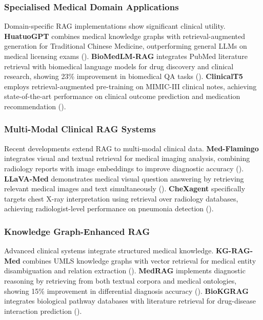 \subsubsection{Specialised Medical Domain Applications}
Domain-specific RAG implementations show significant clinical utility. \textbf{HuatuoGPT} combines medical knowledge graphs with retrieval-augmented generation for Traditional Chinese Medicine, outperforming general LLMs on medical licensing exams (\citep{zhang2023huatuogpt}). \textbf{BioMedLM-RAG} integrates PubMed literature retrieval with biomedical language models for drug discovery and clinical research, showing 23\% improvement in biomedical QA tasks (\citep{bolton2024biomedlm}). \textbf{ClinicalT5} employs retrieval-augmented pre-training on MIMIC-III clinical notes, achieving state-of-the-art performance on clinical outcome prediction and medication recommendation (\citep{lehman2023clinicalt5}).

\subsubsection{Multi-Modal Clinical RAG Systems}
Recent developments extend RAG to multi-modal clinical data. \textbf{Med-Flamingo} integrates visual and textual retrieval for medical imaging analysis, combining radiology reports with image embeddings to improve diagnostic accuracy (\citep{moor2023medflamingo}). \textbf{LLaVA-Med} demonstrates medical visual question answering by retrieving relevant medical images and text simultaneously (\citep{li2023llavamed}). \textbf{CheXagent} specifically targets chest X-ray interpretation using retrieval over radiology databases, achieving radiologist-level performance on pneumonia detection (\citep{chen2024chexagent}).

\subsubsection{Knowledge Graph-Enhanced RAG}
Advanced clinical systems integrate structured medical knowledge. \textbf{KG-RAG-Med} combines UMLS knowledge graphs with vector retrieval for medical entity disambiguation and relation extraction (\citep{yasunaga2023kgragmed}). \textbf{MedRAG} implements diagnostic reasoning by retrieving from both textual corpora and medical ontologies, showing 15\% improvement in differential diagnosis accuracy (\citep{xiong2024medrag}). \textbf{BioKGRAG} integrates biological pathway databases with literature retrieval for drug-disease interaction prediction (\citep{wang2024biokgrag}).

